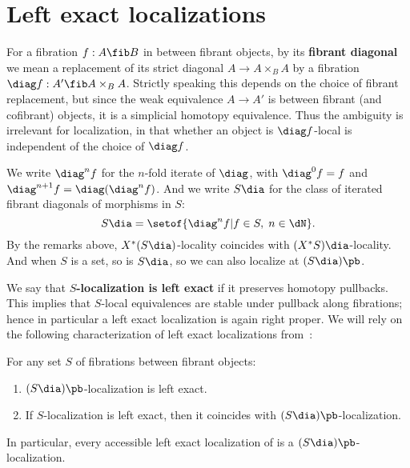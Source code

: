 \section{Left exact localizations}
\label{sec:lex-loc}

For a fibration $f:A\fib B$ in \E between fibrant objects, by its \textbf{fibrant diagonal} we mean a replacement of its strict diagonal $A\to A\times_B A$ by a fibration $\diag f : A' \fib A\times_B A$.
Strictly speaking this depends on the choice of fibrant replacement, but since the weak equivalence $A\to A'$ is between fibrant (and cofibrant) objects, it is a simplicial homotopy equivalence.
Thus the ambiguity is irrelevant for localization, in that whether an object is $\diag f$-local is independent of the choice of $\diag f$.

We write $\diag^n f$ for the $n$-fold iterate of $\diag$, with $\diag^0 f = f$ and $\diag^{n+1} f = \diag(\diag^n f)$.
And we write $S\dia$ for the class of iterated fibrant diagonals of morphisms in $S$:
\[ S\dia = \setof{ \diag^n f | f\in S,\; n\in \dN}.\]
By the remarks above, $X^*(S\dia)$-locality coincides with $(X^*S)\dia$-locality.
And when $S$ is a set, so is $S\dia$, so we can also localize at $(S\dia)\pb$.

We say that \textbf{$S$-localization is left exact} if it preserves homotopy pullbacks.
This implies %
that $S$-local equivalences are stable under pullback along fibrations; hence in particular a left exact localization is again right proper.
We will rely on the following characterization of left exact localizations from~\cite{abfj:lexloc}:

\begin{thm}\label{thm:abfj}
  For any set $S$ of fibrations between fibrant objects:
  \begin{enumerate}
  \item $(S\dia)\pb$-localization is left exact.
  \item If $S$-localization is left exact, then it coincides with $(S\dia)\pb$-localization.
  \end{enumerate}
  In particular, every accessible left exact localization of \E is a $(S\dia)\pb$-localization.
\end{thm}

